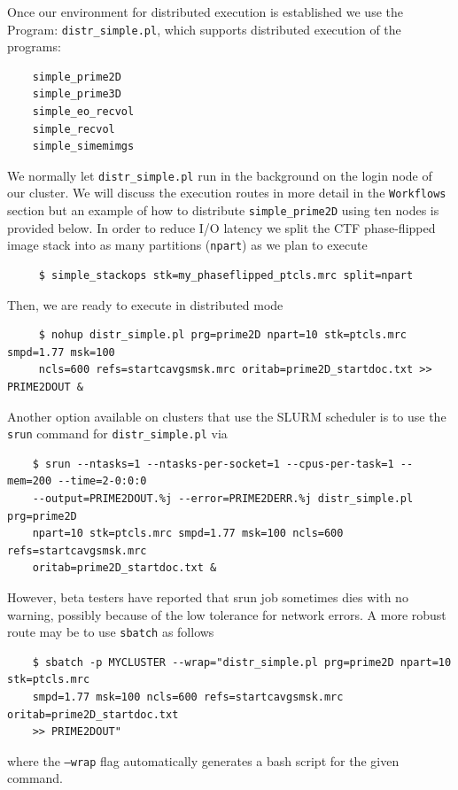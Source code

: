 \documentclass[a4paper,11pt]{article}
\newcommand{\prgname}[1]{\textcolor{NavyBlue}{\texttt{#1}}}
\begin{document}
Once our environment for distributed execution is established we use the {Program: \prgname{distr\_simple.pl}}, which supports distributed execution of the programs:
\begin{verbatim}
    simple_prime2D
    simple_prime3D
    simple_eo_recvol
    simple_recvol
    simple_simemimgs
\end{verbatim}
We normally let \prgname{distr\_simple.pl} run in the background on the login node of our cluster. We will discuss the execution routes in more detail in the \texttt{Workflows} section but an example of how to distribute \prgname{simple\_prime2D} using ten nodes is provided below. In order to reduce I/O latency we split the CTF phase-flipped image stack into as many partitions (\texttt{npart}) as we plan to execute
\begin{verbatim}
     $ simple_stackops stk=my_phaseflipped_ptcls.mrc split=npart
\end{verbatim}
Then, we are ready to execute in distributed mode
\begin{verbatim}
     $ nohup distr_simple.pl prg=prime2D npart=10 stk=ptcls.mrc smpd=1.77 msk=100
     ncls=600 refs=startcavgsmsk.mrc oritab=prime2D_startdoc.txt >> PRIME2DOUT &
\end{verbatim}
Another option available on clusters that use the SLURM scheduler is to use the \texttt{srun} command for \prgname{distr\_simple.pl} via
\begin{verbatim}
    $ srun --ntasks=1 --ntasks-per-socket=1 --cpus-per-task=1 --mem=200 --time=2-0:0:0
    --output=PRIME2DOUT.%j --error=PRIME2DERR.%j distr_simple.pl prg=prime2D 
    npart=10 stk=ptcls.mrc smpd=1.77 msk=100 ncls=600 refs=startcavgsmsk.mrc 
    oritab=prime2D_startdoc.txt &
\end{verbatim}
However, beta testers have reported that srun job sometimes dies with no warning, possibly because of the low tolerance for network errors. A more robust route may be to use \texttt{sbatch} as follows
\begin{verbatim}
    $ sbatch -p MYCLUSTER --wrap="distr_simple.pl prg=prime2D npart=10 stk=ptcls.mrc
    smpd=1.77 msk=100 ncls=600 refs=startcavgsmsk.mrc oritab=prime2D_startdoc.txt 
    >> PRIME2DOUT"
\end{verbatim}
where the \texttt{--wrap} flag automatically generates a bash script for the given command.
\end{document}
